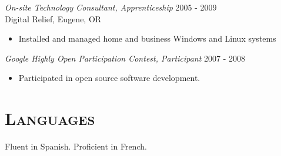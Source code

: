 \documentclass[margin]{res}
\begin{document}
\begin{resume}
    {\sl On-site Technology Consultant, Apprenticeship} \hfill 2005 - 2009 \\
    Digital Relief, Eugene, OR
    \begin{itemize}  \itemsep -2pt %
        \item Installed and managed home and business Windows and Linux systems
    \end{itemize}

    {\sl Google Highly Open Participation Contest, Participant} \hfill 2007 - 2008
    \begin{itemize}  \itemsep -2pt %
        \item Participated in open source software development.
    \end{itemize}

\section{\textsc{Languages}} Fluent in Spanish. Proficient in French.

\end{resume}
\end{document}
